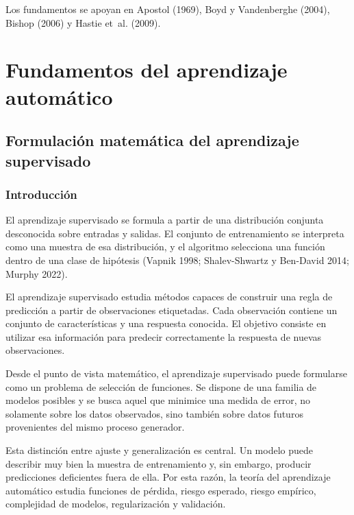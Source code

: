 \documentclass[
  spanish,
  10.5pt,
  letterpaper,
  DIV=11,
  numbers=noendperiod,
  oneside,
  open=any]{scrreprt}
\theoremstyle{definition}
\theoremstyle{definition}
\theoremstyle{plain}
\theoremstyle{remark}
\begin{document}

Los fundamentos se apoyan en Apostol (1969), Boyd y Vandenberghe (2004),
Bishop (2006) y Hastie et~al. (2009).

\part{Fundamentos del aprendizaje automático}

\chapter{Formulación matemática del aprendizaje
supervisado}\label{sec-aprendizaje-supervisado}

\section*{Introducción}\label{introducciuxf3n-5}


El aprendizaje supervisado se formula a partir de una distribución
conjunta desconocida sobre entradas y salidas. El conjunto de
entrenamiento se interpreta como una muestra de esa distribución, y el
algoritmo selecciona una función dentro de una clase de hipótesis
(Vapnik 1998; Shalev-Shwartz y Ben-David 2014; Murphy 2022).

El aprendizaje supervisado estudia métodos capaces de construir una
regla de predicción a partir de observaciones etiquetadas. Cada
observación contiene un conjunto de características y una respuesta
conocida. El objetivo consiste en utilizar esa información para predecir
correctamente la respuesta de nuevas observaciones.

Desde el punto de vista matemático, el aprendizaje supervisado puede
formularse como un problema de selección de funciones. Se dispone de una
familia de modelos posibles y se busca aquel que minimice una medida de
error, no solamente sobre los datos observados, sino también sobre datos
futuros provenientes del mismo proceso generador.

Esta distinción entre ajuste y generalización es central. Un modelo
puede describir muy bien la muestra de entrenamiento y, sin embargo,
producir predicciones deficientes fuera de ella. Por esta razón, la
teoría del aprendizaje automático estudia funciones de pérdida, riesgo
esperado, riesgo empírico,
complejidad de modelos, regularización y validación.
\end{document}
